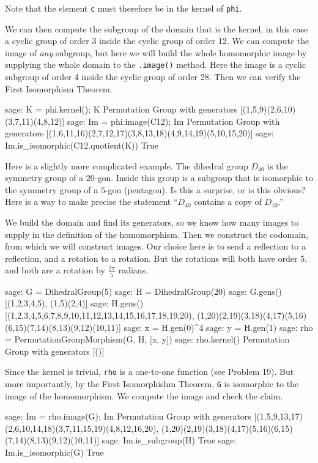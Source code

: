%
Note that the element \verb?c? must therefore be in the kernel of \verb?phi?.\par
%
We can then compute the subgroup of the domain that is the kernel, in this case a cyclic group of order 3 inside the cyclic group of order 12.  We can compute the image of \emph{any} subgroup, but here we will build the whole homomorphic image by supplying the whole domain to the \verb?.image()? method.  Here the image is a cyclic subgroup of order 4 inside the cyclic group of order 28.  Then we can verify the First Isomorphism Theorem.
%
\begin{sageexample}
sage: K = phi.kernel(); K
Permutation Group with generators [(1,5,9)(2,6,10)(3,7,11)(4,8,12)]
sage: Im = phi.image(C12); Im
Permutation Group with generators
[(1,6,11,16)(2,7,12,17)(3,8,13,18)(4,9,14,19)(5,10,15,20)]
sage: Im.is_isomorphic(C12.quotient(K))
True
\end{sageexample}
%
Here is a slightly more complicated example.  The dihedral group $D_{40}$ is the symmetry group of a $20$-gon.  Inside this group is a subgroup that is isomorphic to the symmetry group of a $5$-gon (pentagon).  Is this a surprise, or is this obvious?  Here is a way to make precise the statement ``$D_{40}$ contains a copy of $D_{10}$.''\par
%
We build the domain and find its generators, so we know how many images to supply in the definition of the homomorphism.  Then we construct the codomain, from which we will construct images.  Our choice here is to send a reflection to a reflection, and a rotation to a rotation.  But the rotations will both have order 5, and both are a rotation by $\frac{2\pi}{5}$ radians.
%
\begin{sageexample}
sage: G = DihedralGroup(5)
sage: H = DihedralGroup(20)
sage: G.gens()
[(1,2,3,4,5), (1,5)(2,4)]
sage: H.gens()
[(1,2,3,4,5,6,7,8,9,10,11,12,13,14,15,16,17,18,19,20),
 (1,20)(2,19)(3,18)(4,17)(5,16)(6,15)(7,14)(8,13)(9,12)(10,11)]
sage: x = H.gen(0)^4
sage: y = H.gen(1)
sage: rho = PermutationGroupMorphism(G, H, [x, y])
sage: rho.kernel()
Permutation Group with generators [()]
\end{sageexample}
%
Since the kernel is trivial, \verb?rho? is a one-to-one function (see Problem 19).  But more importantly, by the First Isomorphishm Theorem, \verb?G? is isomorphic to the image of the homomorphism.  We compute the image and check the claim.
%
\begin{sageexample}
sage: Im = rho.image(G); Im
Permutation Group with generators
[(1,5,9,13,17)(2,6,10,14,18)(3,7,11,15,19)(4,8,12,16,20),
 (1,20)(2,19)(3,18)(4,17)(5,16)(6,15)(7,14)(8,13)(9,12)(10,11)]
sage: Im.is_subgroup(H)
True
sage: Im.is_isomorphic(G)
True
\end{sageexample}
